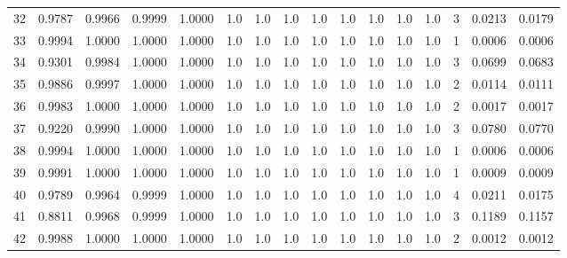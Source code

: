 \begin{tabular}{lrrrrrrrrrrrrrrr}
32  &      0.9787 &  0.9966 &  0.9999 &  1.0000 &     1.0 &     1.0 &     1.0 &     1.0 &     1.0 &     1.0 &      1.0 &        1.0 &      3 &                    0.0213 &                     0.0179 \\
33  &      0.9994 &  1.0000 &  1.0000 &  1.0000 &     1.0 &     1.0 &     1.0 &     1.0 &     1.0 &     1.0 &      1.0 &        1.0 &      1 &                    0.0006 &                     0.0006 \\
34  &      0.9301 &  0.9984 &  1.0000 &  1.0000 &     1.0 &     1.0 &     1.0 &     1.0 &     1.0 &     1.0 &      1.0 &        1.0 &      3 &                    0.0699 &                     0.0683 \\
35  &      0.9886 &  0.9997 &  1.0000 &  1.0000 &     1.0 &     1.0 &     1.0 &     1.0 &     1.0 &     1.0 &      1.0 &        1.0 &      2 &                    0.0114 &                     0.0111 \\
36  &      0.9983 &  1.0000 &  1.0000 &  1.0000 &     1.0 &     1.0 &     1.0 &     1.0 &     1.0 &     1.0 &      1.0 &        1.0 &      2 &                    0.0017 &                     0.0017 \\
37  &      0.9220 &  0.9990 &  1.0000 &  1.0000 &     1.0 &     1.0 &     1.0 &     1.0 &     1.0 &     1.0 &      1.0 &        1.0 &      3 &                    0.0780 &                     0.0770 \\
38  &      0.9994 &  1.0000 &  1.0000 &  1.0000 &     1.0 &     1.0 &     1.0 &     1.0 &     1.0 &     1.0 &      1.0 &        1.0 &      1 &                    0.0006 &                     0.0006 \\
39  &      0.9991 &  1.0000 &  1.0000 &  1.0000 &     1.0 &     1.0 &     1.0 &     1.0 &     1.0 &     1.0 &      1.0 &        1.0 &      1 &                    0.0009 &                     0.0009 \\
40  &      0.9789 &  0.9964 &  0.9999 &  1.0000 &     1.0 &     1.0 &     1.0 &     1.0 &     1.0 &     1.0 &      1.0 &        1.0 &      4 &                    0.0211 &                     0.0175 \\
41  &      0.8811 &  0.9968 &  0.9999 &  1.0000 &     1.0 &     1.0 &     1.0 &     1.0 &     1.0 &     1.0 &      1.0 &        1.0 &      3 &                    0.1189 &                     0.1157 \\
42  &      0.9988 &  1.0000 &  1.0000 &  1.0000 &     1.0 &     1.0 &     1.0 &     1.0 &     1.0 &     1.0 &      1.0 &        1.0 &      2 &                    0.0012 &                     0.0012 \\

\end{tabular}
